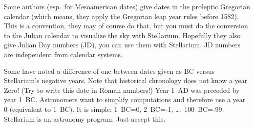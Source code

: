 Some authors (esp.\ for Mesoamerican dates) give dates in the proleptic Gregorian calendar 
(which means, they apply the Gregorian leap year rules before 1582). This is a convention, they may of course do that, 
but you must do the conversion to the Julian calendar to visualize the sky with Stellarium. 
Hopefully they also give Julian Day numbers (JD), you can use them with Stellarium. 
JD numbers are independent from calendar systems. 

Some have noted a difference of one between dates given as BC versus Stellarium's negative years. 
Note that historical chronology does not know a year Zero! (Try to write this date in Roman numbers!) 
Year 1~AD was preceded by year 1~BC. Astronomers want to simplify computations and therefore 
use a year 0 (equivalent to 1~BC). It is simple: 1~BC=0, 2~BC=-1, \ldots. 100~BC=-99. 
Stellarium is an astronomy program. Just accept this.






